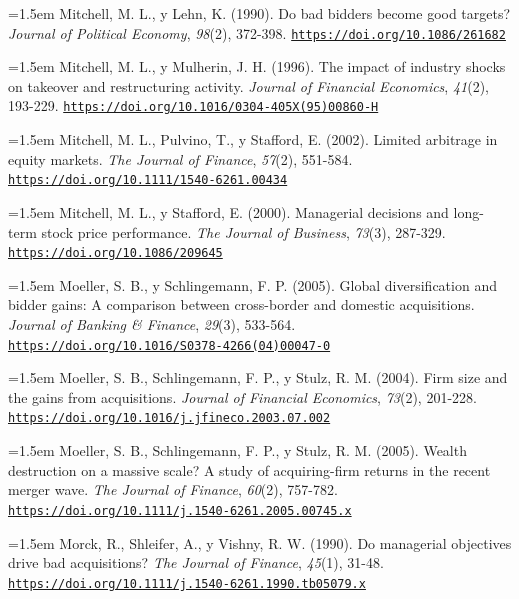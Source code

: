 \documentclass[10pt,a4paper]{article}
\begin{document}
\noindent\hangindent=1.5em Mitchell, M. L., y Lehn, K. (1990). Do bad bidders become good targets? \textit{Journal of Political Economy}, \textit{98}(2), 372-398. \href{https://doi.org/10.1086/261682}{\nolinkurl{https://doi.org/10.1086/261682}}

\noindent\hangindent=1.5em Mitchell, M. L., y Mulherin, J. H. (1996). The impact of industry shocks on takeover and restructuring activity. \textit{Journal of Financial Economics}, \textit{41}(2), 193-229. \href{https://doi.org/10.1016/0304-405X(95)00860-H}{\nolinkurl{https://doi.org/10.1016/0304-405X(95)00860-H}}

\noindent\hangindent=1.5em Mitchell, M. L., Pulvino, T., y Stafford, E. (2002). Limited arbitrage in equity markets. \textit{The Journal of Finance}, \textit{57}(2), 551-584. \href{https://doi.org/10.1111/1540-6261.00434}{\nolinkurl{https://doi.org/10.1111/1540-6261.00434}}

\noindent\hangindent=1.5em Mitchell, M. L., y Stafford, E. (2000). Managerial decisions and long-term stock price performance. \textit{The Journal of Business}, \textit{73}(3), 287-329. \href{https://doi.org/10.1086/209645}{\nolinkurl{https://doi.org/10.1086/209645}}

\noindent\hangindent=1.5em Moeller, S. B., y Schlingemann, F. P. (2005). Global diversification and bidder gains: A comparison between cross-border and domestic acquisitions. \textit{Journal of Banking \& Finance}, \textit{29}(3), 533-564. \href{https://doi.org/10.1016/S0378-4266(04)00047-0}{\nolinkurl{https://doi.org/10.1016/S0378-4266(04)00047-0}}

\noindent\hangindent=1.5em Moeller, S. B., Schlingemann, F. P., y Stulz, R. M. (2004). Firm size and the gains from acquisitions. \textit{Journal of Financial Economics}, \textit{73}(2), 201-228. \href{https://doi.org/10.1016/j.jfineco.2003.07.002}{\nolinkurl{https://doi.org/10.1016/j.jfineco.2003.07.002}}

\noindent\hangindent=1.5em Moeller, S. B., Schlingemann, F. P., y Stulz, R. M. (2005). Wealth destruction on a massive scale? A study of acquiring-firm returns in the recent merger wave. \textit{The Journal of Finance}, \textit{60}(2), 757-782. \href{https://doi.org/10.1111/j.1540-6261.2005.00745.x}{\nolinkurl{https://doi.org/10.1111/j.1540-6261.2005.00745.x}}

\noindent\hangindent=1.5em Morck, R., Shleifer, A., y Vishny, R. W. (1990). Do managerial objectives drive bad acquisitions? \textit{The Journal of Finance}, \textit{45}(1), 31-48. \href{https://doi.org/10.1111/j.1540-6261.1990.tb05079.x}{\nolinkurl{https://doi.org/10.1111/j.1540-6261.1990.tb05079.x}}
\end{document}
